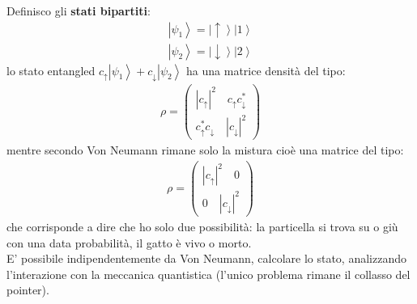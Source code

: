 Definisco gli \textbf{stati bipartiti}:
\begin{equation}\begin{split}
\left|\psi_{1}\right\rangle=\left|\uparrow\right\rangle \left|1\right\rangle
\end{split}\end{equation}
\begin{equation}\begin{split}
\left|\psi_{2}\right\rangle=\left|\downarrow\right\rangle \left|2\right\rangle
\end{split}\end{equation}
lo stato entangled $c_{\uparrow}\left|\psi_{1}\right\rangle + c_{\downarrow}\left|\psi_{2}\right\rangle$ ha una matrice densità del tipo:\\
\begin{equation}\begin{split}
\rho=
\left(\begin{matrix}
\left|c_{\uparrow}\right|^2\quad c_{\uparrow}c_{\downarrow}^* \\
c_{\uparrow}^*c_{\downarrow} \quad \left|c_{\downarrow}\right|^2
\end{matrix}\right)
\end{split}\end{equation}
mentre secondo Von Neumann rimane solo la mistura cioè una matrice del tipo:
\begin{equation}\begin{split}
\rho=
\left(\begin{matrix}
\left|c_{\uparrow}\right|^2\quad 0 \\
0 \quad \left|c_{\downarrow}\right|^2
\end{matrix}\right)
\end{split}\end{equation}
che corrisponde a dire che ho solo due possibilità: la particella si trova su o giù con una data probabilità, il gatto è vivo o morto.\\
E' possibile indipendentemente da Von Neumann, calcolare lo stato, analizzando l'interazione con la meccanica quantistica (l'unico problema rimane il collasso del pointer).


